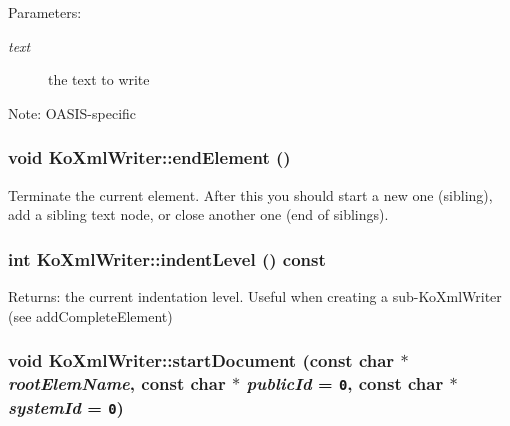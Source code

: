 \begin{Desc}
\item[Parameters:]
\begin{description}
\item[{\em text}]the text to write\end{description}
\end{Desc}
\begin{Desc}
\item[Note:]OASIS-specific \end{Desc}
\hypertarget{classKoXmlWriter_c0c62332ed7c5011e8c8edd9c26019a0}{
\subsubsection[{endElement}]{\setlength{\rightskip}{0pt plus 5cm}void KoXmlWriter::endElement ()}}
\label{classKoXmlWriter_c0c62332ed7c5011e8c8edd9c26019a0}


Terminate the current element. After this you should start a new one (sibling), add a sibling text node, or close another one (end of siblings). \hypertarget{classKoXmlWriter_71173772ef00a18d725d861cd409c0ad}{
\subsubsection[{indentLevel}]{\setlength{\rightskip}{0pt plus 5cm}int KoXmlWriter::indentLevel () const}}
\label{classKoXmlWriter_71173772ef00a18d725d861cd409c0ad}


\begin{Desc}
\item[Returns:]the current indentation level. Useful when creating a sub-KoXmlWriter (see addCompleteElement) \end{Desc}
\hypertarget{classKoXmlWriter_867932c8d3bbecd712572230cb0b64cd}{
\subsubsection[{startDocument}]{\setlength{\rightskip}{0pt plus 5cm}void KoXmlWriter::startDocument (const char $\ast$ {\em rootElemName}, \/  const char $\ast$ {\em publicId} = {\tt 0}, \/  const char $\ast$ {\em systemId} = {\tt 0})}}
\label{classKoXmlWriter_867932c8d3bbecd712572230cb0b64cd}


